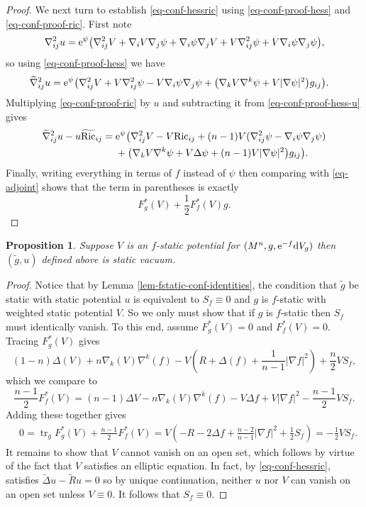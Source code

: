 \documentclass[pdftex]{sigma}
\numberwithin{equation}{section}
\newtheorem{Proposition}[Theorem]{Proposition}
\theoremstyle{definition}
\begin{document}
\begin{proof}
	We next turn to establish \eqref{eq-conf-hessric} using \eqref{eq-conf-proof-hess} and \eqref{eq-conf-proof-ric}. First note
	\[
	\nabla_{ij}^2 u
	={\rm e}^{\psi}\bigl(\nabla_{ij}^2 V + \nabla_iV \nabla_j\psi + \nabla_i\psi \nabla_jV + V\nabla_{ij}^2\psi + V \nabla_i\psi \nabla_j\psi\bigr),
	\]
	so using \eqref{eq-conf-proof-hess} we have
	\begin{align}
		\widetilde\nabla_{ij}^2 u
		&={\rm e}^{\psi}\bigl(\nabla_{ij}^2 V + V\nabla_{ij}^2\psi - V \nabla_i\psi\nabla_j \psi
		+\big(\nabla_k V \nabla^k\psi+V|\nabla\psi|^2\big)g_{ij}\bigr). \label{eq-conf-proof-hess-u}
	\end{align}
	Multiplying \eqref{eq-conf-proof-ric} by $u$ and subtracting it from \eqref{eq-conf-proof-hess-u} gives
	\begin{align*}
		\widetilde\nabla_{ij}^2 u-u \widetilde{\mathrm{Ric}}_{ij}
={}&{\rm e}^{\psi}\bigl(\nabla_{ij}^2 V - V\mathrm{Ric}_{ij}
		+(n-1)V(\nabla_{ij}^2\psi-\nabla_i\psi \nabla_j\psi) \nonumber\\
		&
		+\big(\nabla_k V \nabla^k\psi+V\Delta\psi+(n-1)V|\nabla\psi|^2\big)g_{ij}\bigr). \label{eq-conf-proof-hessric-new}
	\end{align*}
	Finally, writing everything in terms of $f$ instead of $\psi$ then comparing with \eqref{eq-adjoint} shows that the term in parentheses is exactly
	\[
	F_g^*(V)+\frac12 F_f^*(V) g. \tag*{\qed}
	\]
\renewcommand{\qed}{}
\end{proof}


\begin{Proposition}\label{prop-fstatic-to-static}
	Suppose $V$ is an $f$-static potential for $(M^n,g,{\rm e}^{-f}{\rm d}V_g)$ then $(\widetilde g,u)$ defined above is static vacuum.
\end{Proposition}

\begin{proof}
	Notice that by Lemma \ref{lem-fstatic-conf-identities}, the condition that $\widetilde g$ be static with static potential $u$ is equivalent to $S_f\equiv0$ and $g$ is $f$-static with weighted static potential $V$. So we only must show that if $g$ is $f$-static then $S_f$ must identically vanish. To this end, assume $F_g^*(V)=0$ and $F_f^*(V)=0$. Tracing $F_g^*(V)$ gives
	\[
	(1-n)\Delta(V)+n\nabla_k(V)\nabla^k(f)-V\left(R+\Delta(f)+\frac{1}{n-1}|\nabla f|^2\right)+\frac{n}{2}VS_f,
	\]
	which we compare to
	\[
	\frac{n-1}{2}F_f^*(V)=(n-1)\Delta V-n\nabla_k(V)\nabla^k(f)-V\Delta f+V|\nabla f|^2-\frac{n-1}{2}V S_f.
	\]
	Adding these together gives
	\begin{align*}
	&	0=\operatorname{tr}_g F_g^*(V)+\frac{n-1}{2}F_f^*(V)
		 =V\left(-R-2\Delta f+\frac{n-2}{n-1}|\nabla f|^2+\frac{1}{2}S_f \right)
		 =-\frac12 V S_f.
	\end{align*}
	It remains to show that $V$ cannot vanish on an open set, which follows by virtue of the fact that $V$ satisfies an elliptic equation. In fact, by \eqref{eq-conf-hessric},  satisfies $\widetilde \Delta u-\widetilde R u=0$ so by unique continuation, neither $u$ nor $V$ can vanish on an open set unless $V\equiv0$. It follows that $S_f\equiv0$.
\end{proof}
\end{document}
